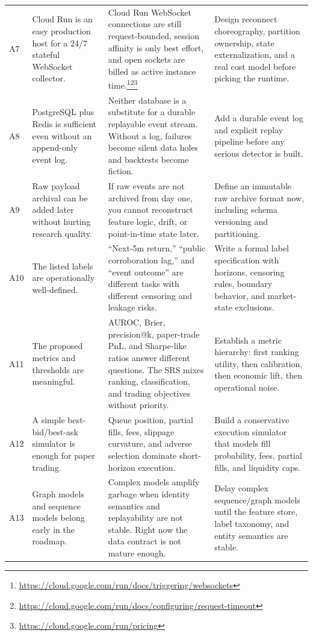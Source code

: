 \documentclass[11pt,letterpaper]{article}
\begin{document}
\begin{longtable}{p{0.7cm}p{3.7cm}p{5.0cm}p{5.0cm}}
\addlinespace
A7 & Cloud Run is an easy production host for a 24/7 stateful WebSocket collector. & Cloud Run WebSocket connections are still request-bounded, session affinity is only best effort, and open sockets are billed as active instance time.\footnote{\url{https://cloud.google.com/run/docs/triggering/websockets}}\footnote{\url{https://cloud.google.com/run/docs/configuring/request-timeout}}\footnote{\url{https://cloud.google.com/run/pricing}} & Design reconnect choreography, partition ownership, state externalization, and a real cost model before picking the runtime. \\
\addlinespace
A8 & PostgreSQL plus Redis is sufficient even without an append-only event log. & Neither database is a substitute for a durable replayable event stream. Without a log, failures become silent data holes and backtests become fiction. & Add a durable event log and explicit replay pipeline before any serious detector is built. \\
\addlinespace
A9 & Raw payload archival can be added later without hurting research quality. & If raw events are not archived from day one, you cannot reconstruct feature logic, drift, or point-in-time state later. & Define an immutable raw archive format now, including schema versioning and partitioning. \\
\addlinespace
A10 & The listed labels are operationally well-defined. & ``Next-5m return,'' ``public corroboration lag,'' and ``event outcome'' are different tasks with different censoring and leakage risks. & Write a formal label specification with horizons, censoring rules, boundary behavior, and market-state exclusions. \\
\addlinespace
A11 & The proposed metrics and thresholds are meaningful. & AUROC, Brier, precision@k, paper-trade PnL, and Sharpe-like ratios answer different questions. The SRS mixes ranking, classification, and trading objectives without priority. & Establish a metric hierarchy: first ranking utility, then calibration, then economic lift, then operational noise. \\
\addlinespace
A12 & A simple best-bid/best-ask simulator is enough for paper trading. & Queue position, partial fills, fees, slippage curvature, and adverse selection dominate short-horizon execution. & Build a conservative execution simulator that models fill probability, fees, partial fills, and liquidity caps. \\
\addlinespace
A13 & Graph models and sequence models belong early in the roadmap. & Complex models amplify garbage when identity semantics and replayability are not stable. Right now the data contract is not mature enough. & Delay complex sequence/graph models until the feature store, label taxonomy, and entity semantics are stable. \\

\end{longtable}
\end{document}
